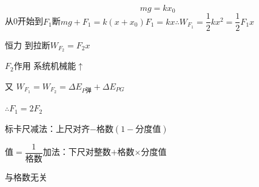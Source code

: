 \begin{problem}
\begin{solution}
\[ mg=kx_0 \]
从0开始到$F_1$断\quad $mg+F_1=k(x+x_0)$\quad $F_1=kx$\quad $\therefore W_{F_1}=\dfrac12kx^2=\dfrac12F_1x$

恒力 到拉断\quad $W_{F_2}=F_2x$

$F_2$作用 系统机械能$\uparrow$

又 $W_{F_1}=W_{F_2}=\Delta E_{P\text{弹}}+\Delta E_{PG}$

$\therefore F_1=2F_2$
\end{solution}
\end{problem}
标卡尺\quad 减法：上尺对齐$-$格数$(1-\text{分度值})$ %

值$=\dfrac{1}{\text{格数}}$\quad 加法：下尺对整数$+$格数$\times$分度值 %

与格数无关 %
